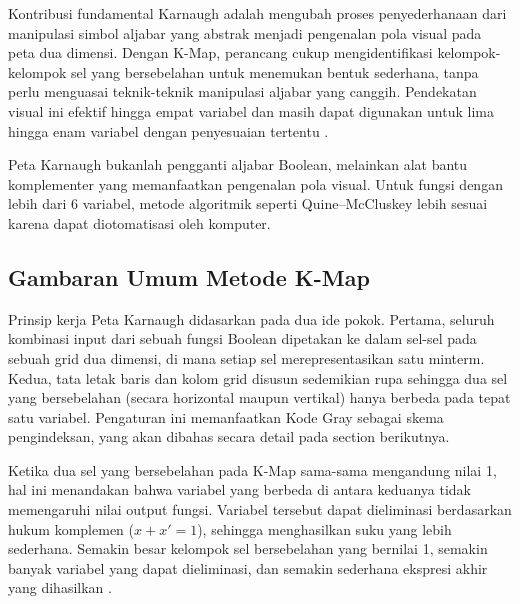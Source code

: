 Kontribusi fundamental Karnaugh adalah mengubah proses penyederhanaan dari manipulasi simbol aljabar yang abstrak menjadi pengenalan pola visual pada peta dua dimensi. Dengan K-Map, perancang cukup mengidentifikasi kelompok-kelompok sel yang bersebelahan untuk menemukan bentuk sederhana, tanpa perlu menguasai teknik-teknik manipulasi aljabar yang canggih. Pendekatan visual ini efektif hingga empat variabel dan masih dapat digunakan untuk lima hingga enam variabel dengan penyesuaian tertentu \cite{wiki_karnaugh}.

\begin{konsep}
Peta Karnaugh bukanlah pengganti aljabar Boolean, melainkan alat bantu komplementer yang memanfaatkan pengenalan pola visual. Untuk fungsi dengan lebih dari 6 variabel, metode algoritmik seperti Quine--McCluskey lebih sesuai karena dapat diotomatisasi oleh komputer.
\end{konsep}

\subsection{Gambaran Umum Metode K-Map}

Prinsip kerja Peta Karnaugh didasarkan pada dua ide pokok. Pertama, seluruh kombinasi input dari sebuah fungsi Boolean dipetakan ke dalam sel-sel pada sebuah grid dua dimensi, di mana setiap sel merepresentasikan satu minterm. Kedua, tata letak baris dan kolom grid disusun sedemikian rupa sehingga dua sel yang bersebelahan (secara horizontal maupun vertikal) hanya berbeda pada tepat satu variabel. Pengaturan ini memanfaatkan Kode Gray sebagai skema pengindeksan, yang akan dibahas secara detail pada section berikutnya.

Ketika dua sel yang bersebelahan pada K-Map sama-sama mengandung nilai 1, hal ini menandakan bahwa variabel yang berbeda di antara keduanya tidak memengaruhi nilai output fungsi. Variabel tersebut dapat dieliminasi berdasarkan hukum komplemen ($x + x' = 1$), sehingga menghasilkan suku yang lebih sederhana. Semakin besar kelompok sel bersebelahan yang bernilai 1, semakin banyak variabel yang dapat dieliminasi, dan semakin sederhana ekspresi akhir yang dihasilkan \cite{rosen2019}.
